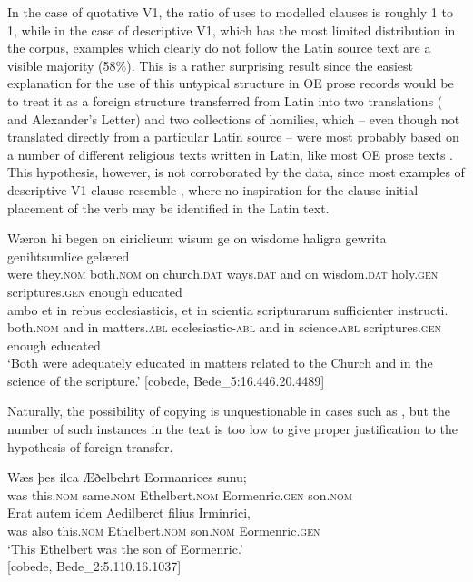 \documentclass[output=paper,colorlinks,citecolor=brown]{langscibook}
\begin{document}
In the case of quotative V1, the ratio of  uses to  modelled clauses is roughly 1 to 1, while in the case of descriptive V1, which has the most limited distribution in the corpus, examples which clearly do not follow the Latin source text are a visible majority (58\%). This is a rather surprising result since the easiest explanation for the use of this untypical structure in OE prose records would be to treat it as a foreign structure transferred from Latin into two translations ( and Alexander's Letter) and two collections of homilies, which – even though not translated directly from a particular Latin source – were most probably based on a number of different religious texts written in Latin, like most OE prose texts \citep{Stanton2002}. This hypothesis, however, is not corroborated by the data, since most examples of descriptive V1 clause resemble , where no inspiration for the clause-initial placement of the verb may be identified in the Latin text.

\ea \label{ex:cichosz:13}%

\ea \label{ex:cichosz:13a}
\gll Wæron   hi     begen     on   ciriclicum   wisum ge   on wisdome     haligra     gewrita     genihtsumlice   gelæred\\
were  they.\textsc{nom}  both.\textsc{nom}  on  church.\textsc{dat}  ways.\textsc{dat} and  on wisdom.\textsc{dat}  holy.\textsc{gen}  scriptures.\textsc{gen}  enough educated\\
\glt
\ex \label{ex:cichosz:13b}
\gll ambo     et   in   rebus     ecclesiasticis,     et in   scientia   scripturarum   sufficienter   instructi.\\
both.\textsc{nom}  and  in  matters.\textsc{abl}  ecclesiastic-\textsc{abl}  and in  science.\textsc{abl}   scriptures.\textsc{gen}  enough    educated\\
\glt ‘Both were adequately educated in matters related to the Church and in the science of the scripture.' \hfill [cobede, Bede\_5:16.446.20.4489]
\z 
\z

Naturally, the possibility of copying is unquestionable in cases such as , but the number of such instances in the text is too low to give proper justification to the hypothesis of foreign transfer.

\ea \label{ex:cichosz:14}%
\ea \label{ex:cichosz:14a}
\gll Wæs   þes     ilca     Æðelbehrt   Eormanrices sunu;\\
was  this.\textsc{nom}  same.\textsc{nom}  Ethelbert.\textsc{nom}  Eormenric.\textsc{gen} son.\textsc{nom}\\
\glt
\ex \label{ex:cichosz:14b}
\gll Erat   autem   idem     Aedilberct   filius     Irminrici, \\
was  also  this.\textsc{nom}  Ethelbert.\textsc{nom}  son.\textsc{nom}  Eormenric.\textsc{gen}\\
\glt ‘This Ethelbert was the son of Eormenric.'\\ \hfill [cobede, Bede\_2:5.110.16.1037]
\z 
\z
\end{document}
